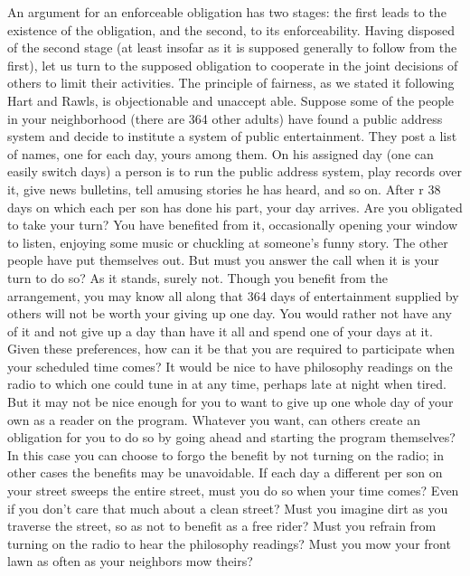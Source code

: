 \documentclass[11pt,openany]{book}
\begin{document}
An argument for an enforceable obligation has two stages: the first leads to the existence of the obligation, and the second, to its enforceability. Having disposed of the second stage (at least insofar as it is supposed generally to follow from the first), let us turn to the supposed obligation to cooperate in the joint decisions of others to limit their activities. The principle of fairness, as we stated it following Hart and Rawls, is objectionable and unaccept able. Suppose some of the people in your neighborhood (there are 364 other adults) have found a public address system and decide to institute a system of public entertainment. They post a list of names, one for each day, yours among them. On his assigned day (one can easily switch days) a person is to run the public address system, play records over it, give news bulletins, tell amusing stories he has heard, and so on. After r 38 days on which each per son has done his part, your day arrives. Are you obligated to take your turn? You have benefited from it, occasionally opening your window to listen, enjoying some music or chuckling at someone's funny story. The other people have put themselves out. But must you answer the call when it is your turn to do so? As it stands, surely not. Though you benefit from the arrangement, you may know all along that 364 days of entertainment supplied by others will not be worth your giving up one day. You would rather not have any of it and not give up a day than have it all and spend one of your days at it. Given these preferences, how can it be that you are required to participate when your scheduled time comes? It would be nice to have philosophy readings on the radio to which one could tune in at any time, perhaps late at night when tired. But it may not be nice enough for you to want to give up one whole day of your own as a reader on the program. Whatever you want, can others create an obligation for you to do so by going ahead and starting the program themselves? In this case you can choose to forgo the benefit by not turning on the radio; in other cases the benefits may be unavoidable. If each day a different per son on your street sweeps the entire street, must you do so when your time comes? Even if you don't care that much about a clean street? Must you imagine dirt as you traverse the street, so as not to benefit as a free rider? Must you refrain from turning on the radio to hear the philosophy readings? Must you mow your front lawn as often as your neighbors mow theirs? 
\end{document}

